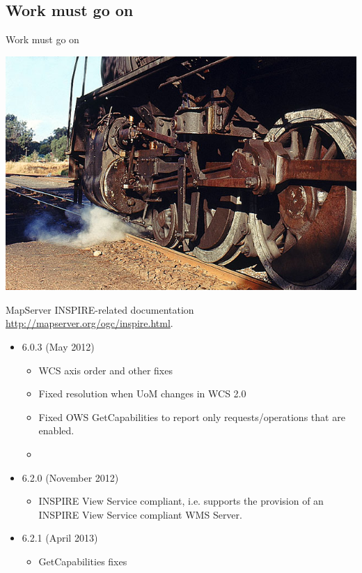 \documentclass[xcolor=dvipsnames]{beamer}
\begin{document}
\subsection{Work must go on}
\begin{frame}{Work must go on}
    \begin{center} 
        \includegraphics[width=\textwidth]{imgs/ils/engine.jpg}
    \end{center}
\end{frame}


\begin{frame}{MapServer}
INSPIRE-related documentation
\url{http://mapserver.org/ogc/inspire.html}. 

\begin{itemize}
    \item 6.0.3 (May 2012)
        \begin{itemize}
            \item WCS axis order and other fixes
            \item Fixed resolution when UoM changes in WCS 2.0
            \item Fixed OWS GetCapabilities to report only requests/operations that are enabled.
            \item \dost
        \end{itemize}
        \pause
    \item 6.2.0 (November 2012)
        \begin{itemize}
            \item INSPIRE View Service compliant, i.e. supports the provision of an INSPIRE View Service compliant WMS Server.
        \end{itemize}
        \pause
    \item 6.2.1 (April 2013)
        \begin{itemize}
            \item GetCapabilities fixes
        \end{itemize}
\end{itemize}
\end{frame}
\end{document}
